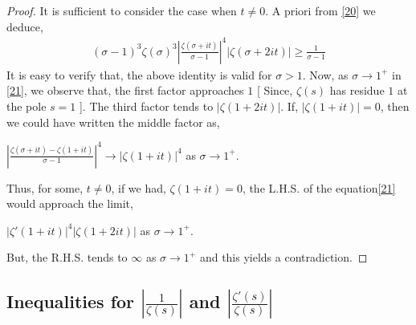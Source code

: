 \documentclass[article,12pt]{elsarticle}
\begin{document}
	\begin{proof}
		It is sufficient to consider the case when $t\neq 0$. A priori from \eqref{20} we deduce, 
		\begin{eqnarray}\label{21}
			{(\sigma-1)}^{3} {\zeta(\sigma)}^{3}|\frac{\zeta(\sigma+it)}{\sigma-1}|^{4}|\zeta(\sigma+2it)|\geq \frac{1}{\sigma-1}
		\end{eqnarray}
		It is easy to verify that, the above identity is valid for $\sigma>1$. Now, as $\sigma\rightarrow 1^{+}$ in \eqref{21}, we observe that, the first factor approaches $1$    [ Since, $\zeta(s)$ has residue $1$ at the pole $s=1$ ]. The third factor tends to $|\zeta(1+2it)|$. If, $|\zeta(1+it)|=0$, then we could have written the middle factor as, 
		\begin{center}
			$	|\frac{\zeta(\sigma+it)-\zeta(1+it)}{\sigma-1}|^{4}\rightarrow |\zeta(1+it)|^{4}$ as $\sigma\rightarrow 1^{+}$.
		\end{center}	
		Thus, for some, $t\neq 0$, if we had, $\zeta(1+it)=0$, the L.H.S. of the equation\eqref{21} would approach the limit, 
		\begin{center}
			$|\zeta'(1+it)|^{4}|\zeta(1+2it)|$ \hspace{20pt} as \hspace{10pt}  $\sigma\rightarrow 1^{+}$.
		\end{center} 
		But, the R.H.S. tends to $\infty$ as $\sigma\rightarrow 1^{+}$ and this yields a contradiction.
	\end{proof}
	
	\subsection{Inequalities for $|\frac{1}{\zeta(s)}|$ and $|\frac{\zeta'(s)}{\zeta(s)}|$}
	
\end{document}
